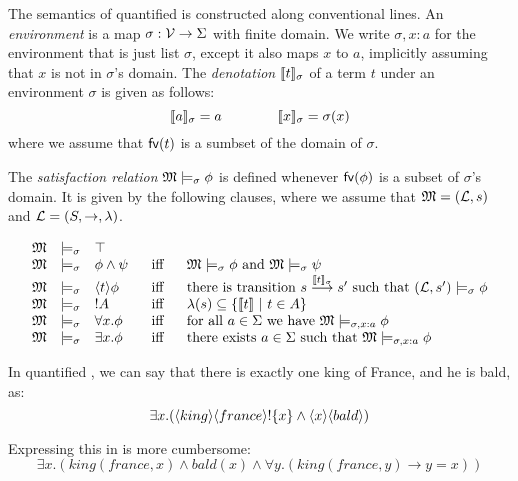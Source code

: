\begin{definition}
The semantics of quantified \cathoristic{} is constructed along
conventional lines. An \emph{environment} is a map $\sigma : \mathcal{V}
\rightarrow \Sigma$ with finite domain.  We write $\sigma, x : a$ for
the environment that is just list $\sigma$, except it also maps $x$ to
$a$, implicitly assuming that $x$ is not in $\sigma$'s domain.  The
\emph{denotation} $\lbrack\!\lbrack t \rbrack\!\rbrack_{\sigma}$ of a term $t$ under an
environment $\sigma$ is given as follows:
\[
   \lbrack\!\lbrack a \rbrack\!\rbrack_{\sigma} = a
      \qquad\qquad
   \lbrack\!\lbrack x \rbrack\!\rbrack_{\sigma} = \sigma(x)
\]
where we assume that $\mathsf{fv}(t)$ is a sumbset of the domain of $\sigma$.

The \emph{satisfaction
  relation} $\frak{M} \models_{\sigma} \phi$ is defined whenever
$\mathsf{fv}(\phi)$ is a subset of $\sigma$'s domain. It is given by the
following clauses, where we assume that $\frak{M} = (\mathcal{L}, s)$ and $\mathcal{L} =
(S, \rightarrow, \lambda)$.

\[
\begin{array}{lclcl}
  \MMM & \models_{\sigma} & \top   \\
  \MMM & \models_{\sigma} & \phi \AND \psi &\ \mbox{ iff } \ & \MMM  \models_{\sigma} \phi \mbox { and } \MMM \models_{\sigma} \psi  \\
  \MMM & \models_{\sigma} & \langle t \rangle \phi & \mbox{ iff } & \text{there is transition } s \TRANS{\SEMB{t}_{\sigma}} s' \mbox { such that } (\LLL, s') \models_{\sigma} \phi  \\
  \MMM & \models_{\sigma} & \fBang A &\mbox{ iff } & \lambda(s) \subseteq \{\SEMB{t}\ |\ t \in A\} \\
  \MMM & \models_{\sigma} & \forall x.\phi &\mbox{ iff } & \text{for all} \ a \in \Sigma\ \text{we have}\ \MMM \models_{\sigma, x : a} \phi \\
  \MMM & \models_{\sigma} & \exists x.\phi &\mbox{ iff } & \text{there exists} \ a \in \Sigma \ \text{such that}\  \MMM \models_{\sigma, x : a} \phi
\end{array}
\]


\end{definition}

\NI In quantified \cathoristic{}, we can say that there is exactly one
king of France, and he is bald, as:
\[
   \exists x . (\langle king \rangle \langle france \rangle ! \{x\} \land \langle x \rangle \langle bald \rangle )
\]

\NI Expressing this in \fol{} is more cumbersome:
\[
   \exists x. ( king(france, x) \land bald(x) \land \forall y. ( king(france, y) \rightarrow y = x ))
\]

